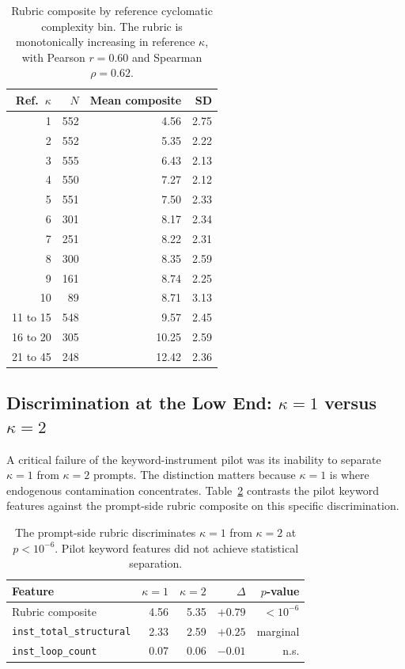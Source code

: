 \documentclass{article}
\begin{document}
\begin{table}[h]
\centering
\caption{Rubric composite by reference cyclomatic complexity bin. The rubric is monotonically increasing in reference $\kappa$, with Pearson $r=0.60$ and Spearman $\rho=0.62$.}
\label{tab:rubric-ref-cc}
\begin{tabular}{@{}rrrr@{}}
\toprule
Ref.\ $\kappa$ & $N$ & Mean composite & SD \\
\midrule
1     & 552 & 4.56  & 2.75 \\
2     & 552 & 5.35  & 2.22 \\
3     & 555 & 6.43  & 2.13 \\
4     & 550 & 7.27  & 2.12 \\
5     & 551 & 7.50  & 2.33 \\
6     & 301 & 8.17  & 2.34 \\
7     & 251 & 8.22  & 2.31 \\
8     & 300 & 8.35  & 2.59 \\
9     & 161 & 8.74  & 2.25 \\
10    & 89  & 8.71  & 3.13 \\
11 to 15 & 548 & 9.57  & 2.45 \\
16 to 20 & 305 & 10.25 & 2.59 \\
21 to 45 & 248 & 12.42 & 2.36 \\
\bottomrule
\end{tabular}
\end{table}

\subsection{Discrimination at the Low End: $\kappa=1$ versus $\kappa=2$}

A critical failure of the keyword-instrument pilot was its inability to separate $\kappa=1$ from $\kappa=2$ prompts. The distinction matters because $\kappa=1$ is where endogenous contamination concentrates. Table~\ref{tab:low-end-separation} contrasts the pilot keyword features against the prompt-side rubric composite on this specific discrimination.

\begin{table}[h]
\centering
\caption{The prompt-side rubric discriminates $\kappa=1$ from $\kappa=2$ at $p<10^{-6}$. Pilot keyword features did not achieve statistical separation.}
\label{tab:low-end-separation}
\begin{tabular}{@{}lrrrr@{}}
\toprule
Feature & $\kappa=1$ & $\kappa=2$ & $\Delta$ & $p$-value \\
\midrule
Rubric composite                  & 4.56 & 5.35 & $+0.79$ & $<10^{-6}$ \\
\texttt{inst\_total\_structural}  & 2.33 & 2.59 & $+0.25$ & marginal \\
\texttt{inst\_loop\_count}        & 0.07 & 0.06 & $-0.01$ & n.s. \\
\bottomrule
\end{tabular}
\end{table}
\end{document}
